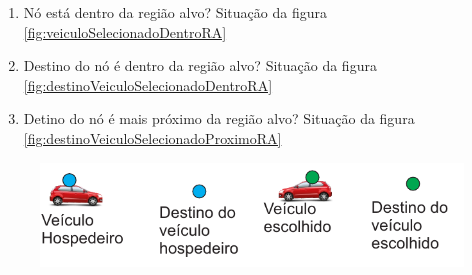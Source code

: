 \begin{enumerate}
	\item Nó está dentro da região alvo? Situação da figura \ref{fig:veiculoSelecionadoDentroRA}
	\item Destino do nó é dentro da região alvo? Situação da figura \ref{fig:destinoVeiculoSelecionadoDentroRA}
	\item Detino do nó é mais próximo da região alvo? Situação da figura \ref{fig:destinoVeiculoSelecionadoProximoRA}
\end{enumerate}

\begin{figure}[htbp]
	\centering
	\includegraphics[scale=0.7]{metodologia/figuras/legendaSelecaoMelhorVeiculo.pdf}
\end{figure}

